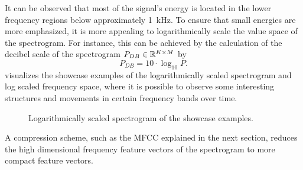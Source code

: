 \FloatBarrier
\noindent
It can be observed that most of the signal's energy is located in the lower frequency regions below approximately \SI{1}{\kilo\hertz}.
To ensure that small energies are more emphasized, it is more appealing to logarithmically scale the value space of the spectrogram.
For instance, this can be achieved by the calculation of the decibel scale of the spectrogram $P_{DB} \in \mathbb{R}^{K \times M}$ by
\begin{equation}\label{eq:signal_spec_log}
  P_{DB} = 10 \cdot \log_{10}{P}.
\end{equation}
 visualizes the showcase examples of the logarithmically scaled spectrogram and log scaled frequency space, where it is possible to observe some interesting structures and movements in certain frequency bands over time.
\begin{figure}[!ht]
  \centering
    \quad
    \quad
  \caption{Logarithmically scaled spectrogram of the showcase examples.}
  \label{fig:signal_spec_log_showcase}
\end{figure}
\FloatBarrier
\noindent
A compression scheme, such as the MFCC explained in the next section, reduces the high dimensional frequency feature vectors of the spectrogram to more compact feature vectors.